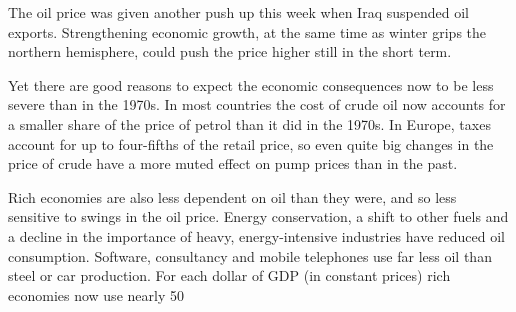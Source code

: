 The oil price was given another push up this week when Iraq suspended oil exports. Strengthening economic growth, at the same time as winter grips the northern hemisphere, could push the price higher still in the short term.

Yet there are good reasons to expect the economic consequences now to be less severe than in the 1970s. In most countries the cost of crude oil now accounts for a smaller share of the price of petrol than it did in the 1970s. In Europe, taxes account for up to four-fifths of the retail price, so even quite big changes in the price of crude have a more muted effect on pump prices than in the past.

Rich economies are also less dependent on oil than they were, and so less sensitive to swings in the oil price. Energy conservation, a shift to other fuels and a decline in the importance of heavy, energy-intensive industries have reduced oil consumption. Software, consultancy and mobile telephones use far less oil than steel or car production. For each dollar of GDP (in constant prices) rich economies now use nearly 50%

